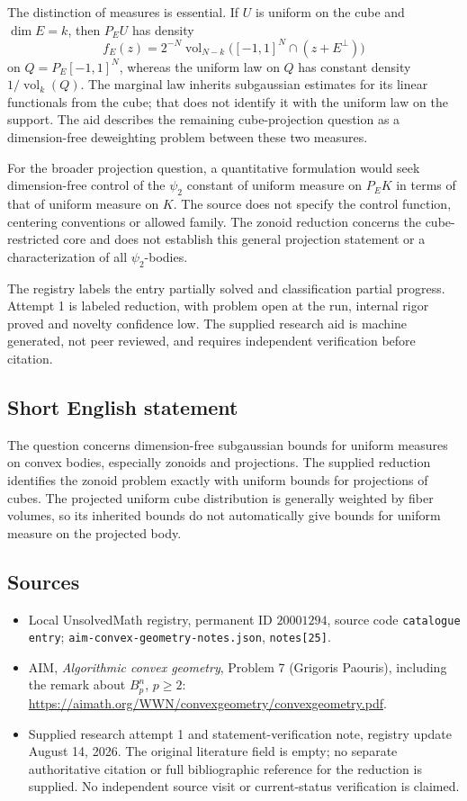 \documentclass[11pt]{article}
\begin{document}
The distinction of measures is essential. If \(U\) is uniform on the cube and \(\dim E=k\), then \(P_EU\) has density
\[
f_E(z)=2^{-N}\operatorname{vol}_{N-k}\bigl([-1,1]^N\cap(z+E^\perp)\bigr)
\]
on \(Q=P_E[-1,1]^N\), whereas the uniform law on \(Q\) has constant density \(1/\operatorname{vol}_k(Q)\). The marginal law inherits subgaussian estimates for its linear functionals from the cube; that does not identify it with the uniform law on the support. The aid describes the remaining cube-projection question as a dimension-free deweighting problem between these two measures.

For the broader projection question, a quantitative formulation would seek dimension-free control of the \(\psi_2\) constant of uniform measure on \(P_EK\) in terms of that of uniform measure on \(K\). The source does not specify the control function, centering conventions or allowed family. The zonoid reduction concerns the cube-restricted core and does not establish this general projection statement or a characterization of all \(\psi_2\)-bodies.

The registry labels the entry partially solved and classification partial progress. Attempt 1 is labeled reduction, with problem open at the run, internal rigor proved and novelty confidence low. The supplied research aid is machine generated, not peer reviewed, and requires independent verification before citation.
\subsection{Short English statement}
The question concerns dimension-free subgaussian bounds for uniform measures on convex bodies, especially zonoids and projections. The supplied reduction identifies the zonoid problem exactly with uniform bounds for projections of cubes. The projected uniform cube distribution is generally weighted by fiber volumes, so its inherited bounds do not automatically give bounds for uniform measure on the projected body.
\subsection{Sources}
\begin{itemize}
\item Local UnsolvedMath registry, permanent ID \(20001294\), source code \texttt{catalogue entry}; \texttt{aim-convex-geometry-notes.json}, \texttt{notes[25]}.
\item AIM, \emph{Algorithmic convex geometry}, Problem 7 (Grigoris Paouris), including the remark about \(B_p^n\), \(p\ge2\): \url{https://aimath.org/WWN/convexgeometry/convexgeometry.pdf}.
\item Supplied research attempt 1 and statement-verification note, registry update August 14, 2026. The original literature field is empty; no separate authoritative citation or full bibliographic reference for the reduction is supplied. No independent source visit or current-status verification is claimed.
\end{itemize}
\end{document}
